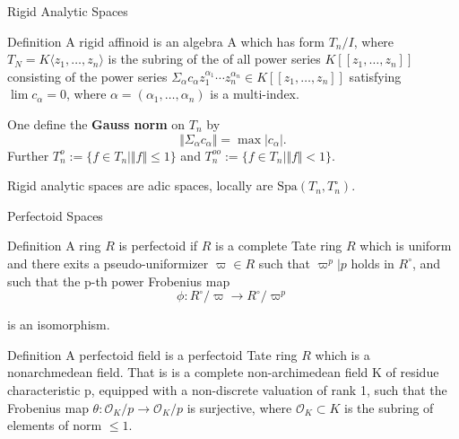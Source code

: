 \documentclass[aspectratio=1610]{ctexbeamer}
\def  \Spa      {\mathrm{Spa}}
\def  \co       {\mathcal{O}}
\begin{document}
\begin{frame}{Rigid Analytic Spaces}
	\begin{block}{Definition}
		A rigid affinoid is  an algebra A which has form $T_n/I$, where $T_N = K\langle z_1, \dots, z_n \rangle$  is the subring of the of all  power series $K[[z_1, \dots,z_n]]$ consisting of the power series $\Sigma_{\alpha} c_{\alpha}z_1^{\alpha_1} \cdots z_n^{\alpha_n} \in K[[z_1, \dots, z_n]]$ satisfying $\lim c_{\alpha}=0$, where $\alpha=(\alpha_1, \dots, \alpha_n)$ is a multi-index.
	\end{block}
	
	One define the  \textbf{Gauss norm} on $T_n$ by
	$$
	\Vert \Sigma_{\alpha}  c_{\alpha} \Vert = \max|c_{\alpha}|.
	$$
	Further $T_n^o:= \{ f \in T_n | \Vert f \Vert  \leq 1\}$ and $T_n^{oo}:= \{ f \in T_n | \Vert f \Vert  < 1\}$.
	
	 Rigid analytic spaces are adic spaces, locally are  $\Spa(T_n, T_n^{\circ})$.
\end{frame}








\begin{frame}{Perfectoid Spaces}

\begin{block}{Definition}
	A ring $R$  is  perfectoid if $R$   is   a complete Tate ring $R$   which is uniform  and there exits a pseudo-uniformizer $\varpi \in R$ such that $\varpi^p | p$ holds in $R^{\circ}$, and such that the p-th power Frobenius map
	$$
	\phi: R^{\circ}/\varpi \to R^{\circ}/ \varpi^p
	$$
	
	is an isomorphism.
\end{block}


\begin{block}{Definition}
	A perfectoid field is a perfectoid Tate ring $R$  which is a nonarchmedean field. That is
	is a complete non-archimedean field K of residue characteristic p, equipped with a non-discrete valuation of rank 1, such that the Frobenius map $\theta: \co_K/p \to  \co_K/p $ is surjective, where $\co_K \subset K$ is the
	subring of elements of norm $\leq 1$.
\end{block}


\end{frame}
\end{document}
